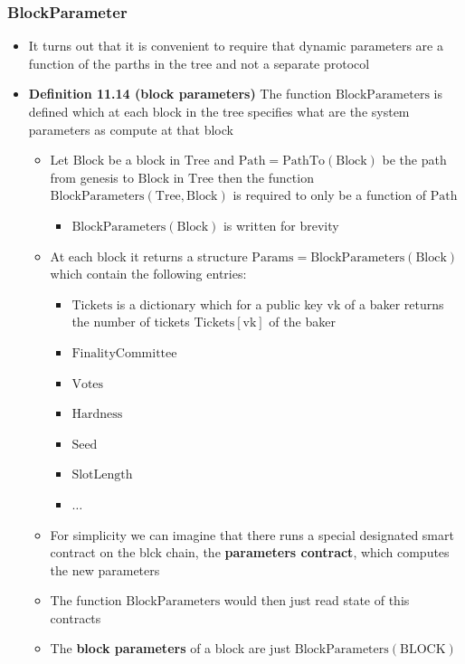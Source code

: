 \documentclass[11pt]{article}
\begin{document}
\subsubsection{BlockParameter}
\label{sec:org4ec0a2b}
\begin{itemize}
\item It turns out that it is convenient to require that dynamic parameters are a function of the parths in the tree and not a separate protocol

\item \textbf{Definition 11.14 (block parameters)} The function \(\text{BlockParameters}\) is defined which at each block in the tree specifies what are the system parameters as compute at that block
\begin{itemize}
\item Let \(\text{Block}\) be a block in \(\text{Tree}\) and \(\text{Path} = \text{PathTo}(\text{Block})\) be the path from genesis to \(\text{Block}\) in \(\text{Tree}\) then the function \(\text{BlockParameters}(\text{Tree}, \text{Block})\) is required to only be a function of \(\text{Path}\)
\begin{itemize}
\item \(\text{BlockParameters}(\text{Block})\) is written for brevity
\end{itemize}
\item At each block it returns a structure \(\text{Params} = \text{BlockParameters}(\text{Block})\) which contain the following entries:
\begin{itemize}
\item \(\text{Tickets}\) is a dictionary which for a public key \(\text{vk}\) of a baker returns the number of tickets \(\text{Tickets}[\text{vk}]\) of the baker
\item \(\text{FinalityCommittee}\)
\item \(\text{Votes}\)
\item \(\text{Hardness}\)
\item \(\text{Seed}\)
\item \(\text{SlotLength}\)
\item \(\dots\)
\end{itemize}
\item For simplicity we can imagine that there runs a special designated smart contract on the blck chain, the \textbf{parameters contract}, which computes the new parameters
\item The function \(\text{BlockParameters}\) would then just read state of this contracts
\item The \textbf{block parameters} of a block are just \(\text{BlockParameters}(\text{BLOCK})\)
\end{itemize}


\end{itemize}
\end{document}
